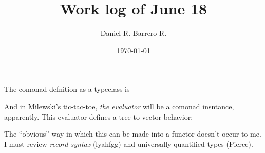 \documentclass{amsart}
\title{Work log of June 18}
\author{Daniel R. Barrero R.}
\date{\today}
\begin{document}
\maketitle

\section{}

The comonad defnition as a typeclass is



And in Milewski's tic-tac-toe, \emph{the evaluator} will be a comonad insntance,
apparently. This evaluator defines a tree-to-vector behavior:



The ``obvious'' way in which this can be made into a functor doesn't occur
to me. I must review \emph{record syntax} (lyahfgg) and universally quantified
types (Pierce).
\end{document}
